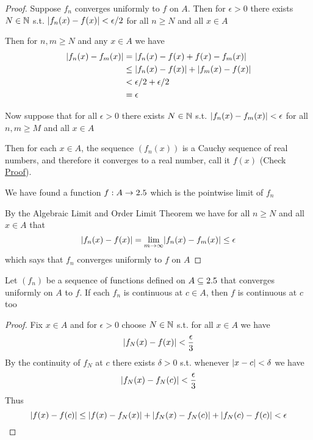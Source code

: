 \documentclass[11pt]{article}
\begin{document}
\begin{proof}
Suppose \(f_n\) converges uniformly to \(f\) on \(A\). Then for \(\epsilon>0\) there
exists \(N\in\mathbb{N}\) s.t. \(\abs{f_n(x)-f(x)}<\epsilon/2\) for all \(n\ge N\)
and all \(x\in A\)

Then for \(n,m\ge N\) and any \(x\in A\) we have
\begin{align*}
\abs{f_n(x)-f_m(x)}&=\abs{f_n(x)-f(x)+f(x)-f_m(x)}\\
&\le\abs{f_n(x)-f(x)}+\abs{f_m(x)-f(x)}\\
&<\epsilon/2+\epsilon/2\\
&=\epsilon
\end{align*}

Now suppose that for all \(\epsilon>0\) there exists \(N\in\mathbb{N}\) s.t.
\(\abs{f_n(x)-f_m(x)}<\epsilon\) for all \(n,m\ge M\) and all \(x\in A\)

Then for each \(x\in A\), the sequence \((f_n(x))\) is a Cauchy sequence of
real numbers, and therefore it converges to a real number, call it \(f(x)\)
(Check \href{https://proofwiki.org/wiki/Cauchy\_Sequence\_Converges\_on\_Real\_Number\_Line}{Proof}).

We have found a function \(f:A\to2.5\) which is the pointwise limit of \(f_n\)

By the Algebraic Limit and Order Limit Theorem we have for all \(n\ge N\) and
all \(x\in A\) that
\begin{equation*}
\abs{f_n(x)-f(x)}=\lim_{m\to\infty}\abs{f_n(x)-f_m(x)}\le\epsilon
\end{equation*}
which says that \(f_n\) converges uniformly to \(f\) on \(A\)
\end{proof}

\begin{theorem}
Let \((f_n)\) be a sequence of functions defined on \(A\subseteq2.5\) that
converges uniformly on \(A\) to \(f\). If each \(f_n\) is continuous at
\(c\in A\), then \(f\) is continuous at \(c\) too
\end{theorem}

\begin{proof}
Fix \(x\in A\) and for \(\epsilon>0\) choose \(N\in\mathbb{N}\) s.t. for all \(x\in A\) we
have
\begin{equation*}
\abs{f_N(x)-f(x)}<\frac{\epsilon}{3}
\end{equation*}
By the continuity of \(f_N\) at \(c\) there exists \(\delta>0\) s.t. whenever
\(\abs{x-c}<\delta\) we have
\begin{equation*}
\abs{f_N(x)-f_N(c)}<\frac{\epsilon}{3}
\end{equation*}
Thus
\begin{equation*}
\abs{f(x)-f(c)}\le\abs{f(x)-f_N(x)}+\abs{f_N(x)-f_N(c)}+\abs{f_N(c)-f(c)}<\epsilon
\end{equation*}
\end{proof}
\end{document}
